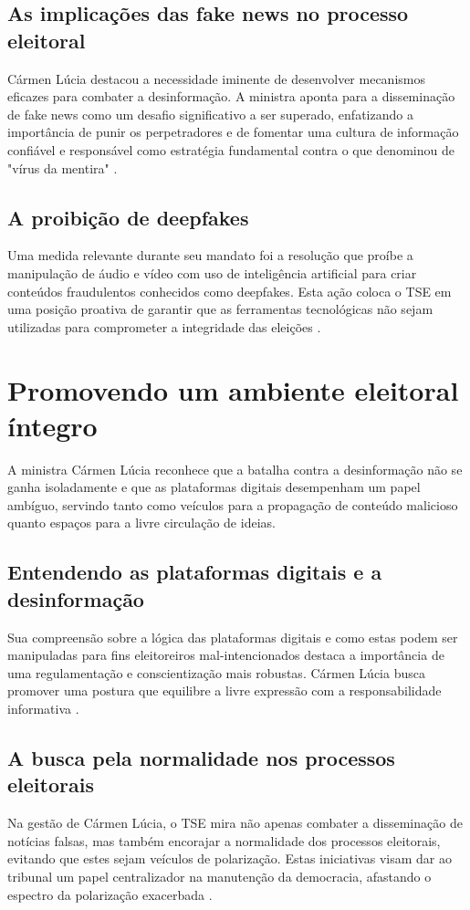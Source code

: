 \documentclass[
   article,       
   12pt,          
   oneside,       
   a4paper,       
   english,       
   brazil,        
   sumario=tradicional
   ]{abntex2}
\begin{document}
\subsection{As implicações das fake news no processo eleitoral}
Cármen Lúcia destacou a necessidade iminente de desenvolver mecanismos eficazes para combater a desinformação. A ministra aponta para a disseminação de fake news como um desafio significativo a ser superado, enfatizando a importância de punir os perpetradores e de fomentar uma cultura de informação confiável e responsável como estratégia fundamental contra o que denominou de "vírus da mentira" \cite{Contra_o_virus_da_mentira_ha_o_remedio_da_inf}.

\subsection{A proibição de deepfakes}
Uma medida relevante durante seu mandato foi a resolução que proíbe a manipulação de áudio e vídeo com uso de inteligência artificial para criar conteúdos fraudulentos conhecidos como deepfakes. Esta ação coloca o TSE em uma posição proativa de garantir que as ferramentas tecnológicas não sejam utilizadas para comprometer a integridade das eleições \cite{Carmen_Lucia_tem_de_afastar_TSE_da_polarizaca}.

\section{Promovendo um ambiente eleitoral íntegro}
A ministra Cármen Lúcia reconhece que a batalha contra a desinformação não se ganha isoladamente e que as plataformas digitais desempenham um papel ambíguo, servindo tanto como veículos para a propagação de conteúdo malicioso quanto espaços para a livre circulação de ideias. 

\subsection{Entendendo as plataformas digitais e a desinformação}
Sua compreensão sobre a lógica das plataformas digitais e como estas podem ser manipuladas para fins eleitoreiros mal-intencionados destaca a importância de uma regulamentação e conscientização mais robustas. Cármen Lúcia busca promover uma postura que equilibre a livre expressão com a responsabilidade informativa \cite{As_duas_preocupacoes_que_rondam_Carmen_Lucia_}.

\subsection{A busca pela normalidade nos processos eleitorais}
Na gestão de Cármen Lúcia, o TSE mira não apenas combater a disseminação de notícias falsas, mas também encorajar a normalidade dos processos eleitorais, evitando que estes sejam veículos de polarização. Estas iniciativas visam dar ao tribunal um papel centralizador na manutenção da democracia, afastando o espectro da polarização exacerbada \cite{Quem_centraliza_poderes_em_uma_pessoa_chamase}.
\end{document}
